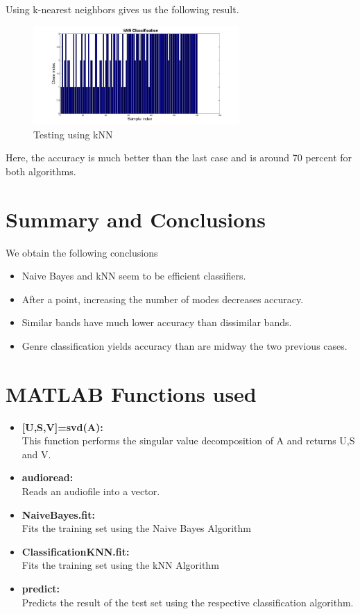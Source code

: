 \documentclass[a4paper]{article}
\begin{document}
Using k-nearest neighbors gives us the following result.


\begin{figure}[H] 
	\centering
	\includegraphics[width=0.7\textwidth]{knngenre.jpg}
	\caption{Testing using kNN}	
\end{figure}

Here, the accuracy is much better than the last case and is around 70 percent for both algorithms.

\section{Summary and Conclusions}

We obtain the following conclusions
\begin{itemize}
\item Naive Bayes and kNN seem to be efficient classifiers.
\item After a point, increasing the number of modes decreases accuracy.
\item Similar bands have much lower accuracy than dissimilar bands.
\item Genre classification yields accuracy than are midway the two previous cases.
\end{itemize}

\newpage

\appendix


\section{MATLAB Functions used}
\begin{itemize}
\item \textbf{[U,S,V]=svd(A): } \\ This function performs the singular value decomposition of A and returns U,S and V.
\item \textbf{audioread: } \\ Reads an audiofile into a vector.
\item \textbf{NaiveBayes.fit: } \\ Fits the training set using the Naive Bayes Algorithm
\item \textbf{ClassificationKNN.fit: } \\ Fits the training set using the kNN Algorithm
\item \textbf{predict: } \\ Predicts the result of the test set using the respective classification algorithm.
\end{itemize}
\end{document}
